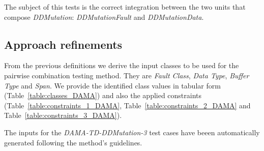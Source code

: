 The subject of this tests is the correct integration between the two units that compose \emph{DDMutation}: \emph{DDMutationFault} and \emph{DDMutationData}.

\subsection{Approach refinements}
%
From the previous definitions we derive the input classes to be used for the pairwise combination testing method.
They are \emph{Fault Class}, \emph{Data Type}, \emph{Buffer Type} and \emph{Span}.
We provide the identified class values in tabular form (Table~\ref{table:classes_DAMA}) and also the applied constraints (Table~\ref{table:constraints_1_DAMA}, Table~\ref{table:constraints_2_DAMA}
 and Table~\ref{table:constraints_3_DAMA}).

The inputs for the \emph{DAMA-TD-DDMutation-3} test cases have beeen automatically generated following the method's guidelines.




